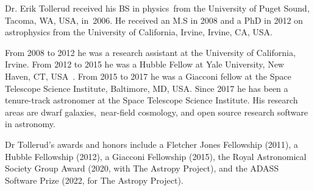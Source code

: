 \documentclass{ieeeaccess}
\begin{document}
\begin{IEEEbiography}
{Dr. Erik Tollerud} received his BS in physics from the University of Puget Sound, Tacoma, WA, USA, in 2006.  He received an M.S in 2008 and a PhD in 2012 on astrophysics from the University of California, Irvine, Irvine, CA, USA.

From 2008 to 2012 he was a research assistant at the University of California, Irvine. From 2012 to 2015 he was a Hubble Fellow at Yale University, New Haven, CT, USA . From 2015 to 2017 he was a Giacconi fellow at the Space Telescope Science Institute, Baltimore, MD, USA.  Since 2017 he has been a tenure-track astronomer at the Space Telescope Science Institute. His research areas are dwarf galaxies, near-field cosmology, and open source research software in astronomy.

Dr Tollerud's awards and honors include a Fletcher Jones Fellowship (2011), a Hubble Fellowship (2012), a Giacconi Fellowship (2015), the Royal Astronomical Society Group Award (2020, with The Astropy Project), and the ADASS Software Prize (2022, for The Astropy Project).
\end{IEEEbiography}
\end{document}
